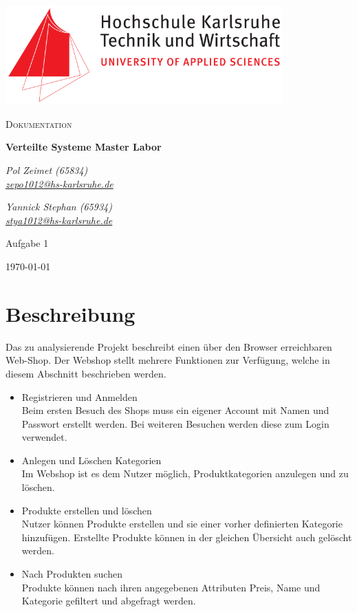\documentclass[12pt,a4paper]{article}
\begin{document}
	\begin{titlepage}
		\centering
		\includegraphics[width=0.8\textwidth]{img/Hska_logo.png}\par\vspace{1cm}
		{\scshape\LARGE Dokumentation\par}
		\vspace{1.5cm}
		{\huge\bfseries Verteilte Systeme Master Labor\par}
		\vspace{2cm}
		{\Large\itshape Pol Zeimet (65834) \\\href{mailto:zepo1012@hs-karlsruhe.de}{zepo1012@hs-karlsruhe.de}\par}
		\vfill
		{\Large\itshape Yannick Stephan (65934) \\\href{mailto:stya1012@hs-karlsruhe.de}{stya1012@hs-karlsruhe.de}\par}
		\vfill
		\large Aufgabe 1
		
		\vfill
		
		{\large \today\par}
	\end{titlepage}
	\section{Beschreibung}
	\label{sec:Beschreibung}
	Das zu analysierende Projekt beschreibt einen über den Browser erreichbaren Web-Shop. Der Webshop stellt mehrere Funktionen zur Verfügung, welche in diesem Abschnitt beschrieben werden.
	\begin{itemize}
	\item{Registrieren und Anmelden}\\ Beim ersten Besuch des Shops muss ein eigener Account mit Namen und Passwort erstellt werden. Bei weiteren Besuchen werden diese zum Login verwendet.
	\item{Anlegen und Löschen Kategorien}\\ Im Webshop ist es dem Nutzer möglich, Produktkategorien anzulegen und zu löschen.
	\item{Produkte erstellen und löschen}\\ Nutzer können Produkte erstellen und sie einer vorher definierten Kategorie hinzufügen. Erstellte Produkte können in der gleichen Übersicht auch gelöscht werden.
	\item{Nach Produkten suchen}\\ Produkte können nach ihren angegebenen Attributen  Preis, Name und Kategorie gefiltert und abgefragt werden.
	\end{itemize}
\end{document}
